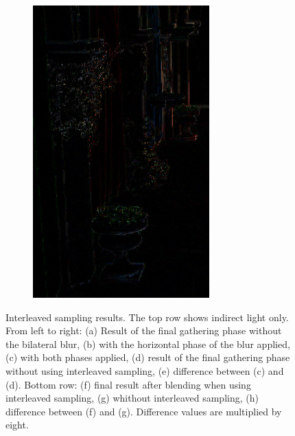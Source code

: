 \begin{figure}[htb]
\begin{subfigure}[b]{0.333\textwidth}
        \includegraphics[width=.95\textwidth]{screenshots/interleaved_difference_shaded}%
        \caption{}
        \label{fig:results:interleaved_difference_shaded}%
    \end{subfigure}%

      \caption{Interleaved sampling results. The top row shows indirect light only. From left to right: (a) Result of the final gathering phase without the bilateral blur, (b) with the horizontal phase of the blur applied, (c) with both phases applied, (d) result of the final gathering phase without using interleaved sampling, (e) difference between (c) and (d). Bottom row: (f) final result after blending when using interleaved sampling, (g) whithout interleaved sampling, (h) difference between (f) and (g). Difference values are multiplied by eight.}
      \label{fig:results:interleaved_quality}
\end{figure}


